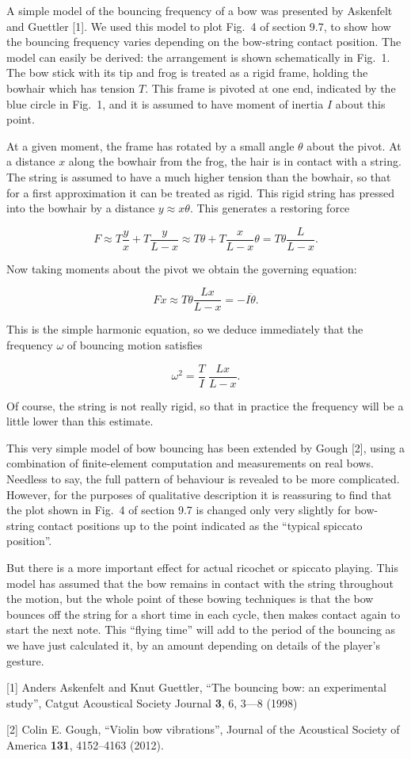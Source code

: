   A simple model of the bouncing frequency of a bow was presented by Askenfelt 
  and Guettler [1]. We used this model to plot Fig.\ 4 of section 9.7, to show 
  how the bouncing frequency varies depending on the bow-string contact 
  position. The model can easily be derived: the arrangement is shown 
  schematically in Fig.\ 1. The bow stick with its tip and frog is treated as a 
  rigid frame, holding the bowhair which has tension $T$. This frame is pivoted 
  at one end, indicated by the blue circle in Fig.\ 1, and it is assumed to 
  have moment of inertia $I$ about this point. 

  At a given moment, the frame has rotated by a small angle $\theta$ about the 
  pivot. At a distance $x$ along the bowhair from the frog, the hair is in 
  contact with a string. The string is assumed to have a much higher tension 
  than the bowhair, so that for a first approximation it can be treated as 
  rigid. This rigid string has pressed into the bowhair by a distance $y 
  \approx x \theta$. This generates a restoring force 

  $$F \approx T \frac{y}{x} +T \frac{y}{L-x} \approx T \theta + T \frac{x}{L-x} 
  \theta = T \theta \frac{L}{L-x} . \tag{1}$$ 

  Now taking moments about the pivot we obtain the governing equation: 

  $$Fx \approx T \theta \frac{Lx}{L-x} =-I \ddot{\theta} . \tag{2}$$ 

  This is the simple harmonic equation, so we deduce immediately that the 
  frequency $\omega$ of bouncing motion satisfies 

  $$\omega^2=\frac{T}{I}~\frac{Lx}{L-x} . \tag{3}$$ 

  Of course, the string is not really rigid, so that in practice the frequency 
  will be a little lower than this estimate. 

  This very simple model of bow bouncing has been extended by Gough [2], using 
  a combination of finite-element computation and measurements on real bows. 
  Needless to say, the full pattern of behaviour is revealed to be more 
  complicated. However, for the purposes of qualitative description it is 
  reassuring to find that the plot shown in Fig.\ 4 of section 9.7 is changed 
  only very slightly for bow-string contact positions up to the point indicated 
  as the ``typical spiccato position''. 

  But there is a more important effect for actual ricochet or spiccato playing. 
  This model has assumed that the bow remains in contact with the string 
  throughout the motion, but the whole point of these bowing techniques is that 
  the bow bounces off the string for a short time in each cycle, then makes 
  contact again to start the next note. This ``flying time'' will add to the 
  period of the bouncing as we have just calculated it, by an amount depending 
  on details of the player's gesture. 

  \sectionreferences{}[1] Anders Askenfelt and Knut Guettler, “The bouncing 
  bow: an experimental study”, Catgut Acoustical Society Journal \textbf{3}, 6, 
  3—8 (1998) 

  [2] Colin E. Gough, ``Violin bow vibrations'', Journal of the Acoustical 
  Society of America \textbf{131}, 4152--4163 (2012). 